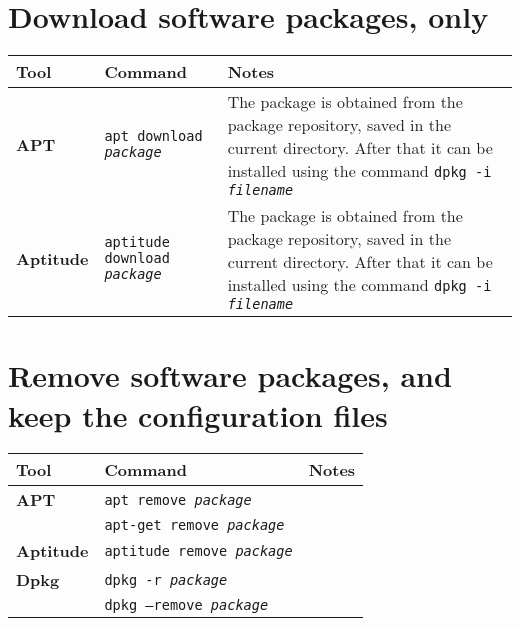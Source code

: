 \documentclass[10pt]{article}
\begin{document}
\section{Download software packages, only}
\begin{tabular}{ p{3.5cm} p{9cm} p{11cm}}
  \hline
  \rowcolor{Gray}
  \textbf{Tool} & \textbf{Command} & \textbf{Notes} \\
  \hline 
  \textbf{APT} & \texttt{apt download \textit{package}} & The package is obtained from the package repository, saved in the current directory. After that it can be installed using the command \newline \texttt{dpkg -i \textit{filename}}\\
  \rowcolor{Gray}
  \textbf{Aptitude} & \texttt{aptitude download \textit{package}} & The package is obtained from the package repository, saved in the current directory. After that it can be installed using the command \newline \texttt{dpkg -i \textit{filename}} \\
  \hline
\end{tabular}

\section{Remove software packages, and keep the configuration files}
\begin{tabular}{ p{3.5cm} p{9cm} p{11cm}}
  \hline
  \rowcolor{Gray}
  \textbf{Tool} & \textbf{Command} & \textbf{Notes} \\
  \hline 
  \textbf{APT} & \texttt{apt remove \textit{package}} & \\
  \rowcolor{Gray}
  & \texttt{apt-get remove \textit{package}} & \\
  \textbf{Aptitude} & \texttt{aptitude remove \textit{package}} & \\
  \rowcolor{Gray}
  \textbf{Dpkg} & \texttt{dpkg -r \textit{package}} & \\
  & \texttt{dpkg --remove \textit{package}} & \\
  \hline
\end{tabular}
\end{document}
